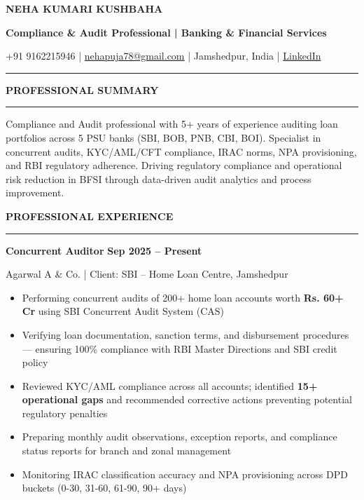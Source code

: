 \documentclass[a4paper,11pt]{article}
\begin{document}
\begin{center}
{\LARGE \textbf{NEHA KUMARI KUSHBAHA}}

\vspace{3pt}
{\textbf{Compliance \& Audit Professional | Banking \& Financial Services}}

\vspace{3pt}
{\small +91 9162215946 | \href{mailto:nehapuja78@gmail.com}{nehapuja78@gmail.com} | Jamshedpur, India | \href{https://www.linkedin.com/in/nomadneha/}{LinkedIn}}
\end{center}

\vspace{6pt}
\noindent\rule{\textwidth}{0.4pt}

\vspace{6pt}
{\large \textbf{\textcolor{sectioncolor}{PROFESSIONAL SUMMARY}}}

\vspace{2pt}
\noindent\rule{\textwidth}{1pt}

\vspace{4pt}
Compliance and Audit professional with 5+ years of experience auditing loan portfolios across 5 PSU banks (SBI, BOB, PNB, CBI, BOI). Specialist in concurrent audits, KYC/AML/CFT compliance, IRAC norms, NPA provisioning, and RBI regulatory adherence. Driving regulatory compliance and operational risk reduction in BFSI through data-driven audit analytics and process improvement.

\vspace{10pt}
{\large \textbf{\textcolor{sectioncolor}{PROFESSIONAL EXPERIENCE}}}

\vspace{2pt}
\noindent\rule{\textwidth}{1pt}

\vspace{6pt}
\noindent\textbf{Concurrent Auditor} \hfill \textbf{Sep 2025 -- Present}

\noindent Agarwal A \& Co. | Client: SBI -- Home Loan Centre, Jamshedpur

\begin{itemize}[leftmargin=16pt, itemsep=1pt, topsep=3pt]
\item Performing concurrent audits of 200+ home loan accounts worth \textbf{Rs. 60+ Cr} using SBI Concurrent Audit System (CAS)
\item Verifying loan documentation, sanction terms, and disbursement procedures — ensuring 100\% compliance with RBI Master Directions and SBI credit policy
\item Reviewed KYC/AML compliance across all accounts; identified \textbf{15+ operational gaps} and recommended corrective actions preventing potential regulatory penalties
\item Preparing monthly audit observations, exception reports, and compliance status reports for branch and zonal management
\item Monitoring IRAC classification accuracy and NPA provisioning across DPD buckets (0-30, 31-60, 61-90, 90+ days)
\end{itemize}
\end{document}
